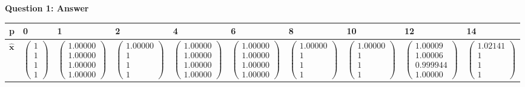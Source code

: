 \documentclass[12pt]{article}
\def\MM#1{\boldsymbol{#1}}
\begin{document}
\textbf{Question 1: Answer}
\begin{center}
	\scriptsize
	\begin{tabular}{| l | l | l | l | l | l | l | l | l | l |}
		\hline
		p & 0 & 1 & 2 & 4 & 6 & 8 & 10 & 12 & 14 \\ \hline
		$\hat{\MM{x}}$ 
		& $\begin{pmatrix}1\\1\\1\\1\end{pmatrix}$
		& $\begin{pmatrix}1.00000\\1.00000\\1.00000\\1.00000\end{pmatrix}$ 
		& $\begin{pmatrix}1.00000\\1\\1\\1\end{pmatrix}$  
		& $\begin{pmatrix}1.00000\\1.00000\\1.00000\\1.00000\end{pmatrix}$
		& $\begin{pmatrix}1.00000\\1.00000\\1.00000\\1.00000\end{pmatrix}$
		& $\begin{pmatrix}1.00000\\1\\1\\1\end{pmatrix}$ 
		& $\begin{pmatrix}1.00000\\1\\1\\1\end{pmatrix}$ 
		& $\begin{pmatrix}1.00009\\1.00006\\0.999944\\1.00000\end{pmatrix}$ 
		& $\begin{pmatrix}1.02141\\1\\1\\1\end{pmatrix}$ \\ \hline
	\end{tabular}
\end{center}
\end{document}
